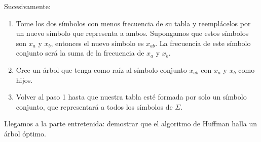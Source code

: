   Sucesivamente:
  \begin{enumerate}
  \item
    Tome los dos símbolos con menos frecuencia de su tabla
    y reemplácelos por un nuevo símbolo que representa a ambos.
    Supongamos que estos símbolos son \(x_a\) y \(x_b\),
    entonces el nuevo símbolo es \(x_{a b}\).
    La frecuencia de este símbolo conjunto
    será la suma de la frecuencia de \(x_a\) y \(x_b\).
  \item
    Cree un árbol que tenga como raíz
    al símbolo conjunto \(x_{a b}\) con \(x_{a}\) y \(x_{b}\) como hijos.
  \item
    Volver al paso 1 hasta que nuestra tabla esté formada
    por solo un símbolo conjunto,
    que representará a todos los símbolos de \(\Sigma\).
  \end{enumerate}
  Llegamos a la parte entretenida:
  demostrar que el algoritmo de Huffman halla un árbol óptimo.
